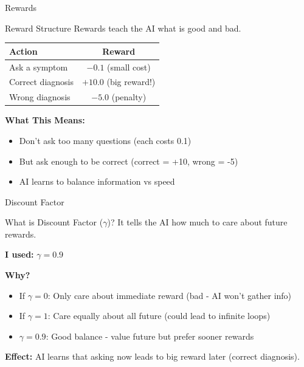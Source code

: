 \documentclass[aspectratio=169]{beamer}
\begin{document}
\begin{frame}{Rewards}
    \begin{block}{Reward Structure}
        Rewards teach the AI what is good and bad.
    \end{block}
    
    \vspace{0.3cm}
    
    \begin{table}
        \centering
        \begin{tabular}{lc}
            \toprule
            \textbf{Action} & \textbf{Reward} \\
            \midrule
            Ask a symptom & $-0.1$ (small cost) \\
            Correct diagnosis & $+10.0$ (big reward!) \\
            Wrong diagnosis & $-5.0$ (penalty) \\
            \bottomrule
        \end{tabular}
    \end{table}
    
    \vspace{0.3cm}
    
    \textbf{What This Means:}
    \begin{itemize}
        \item Don't ask too many questions (each costs 0.1)
        \item But ask enough to be correct (correct = +10, wrong = -5)
        \item AI learns to balance information vs speed
    \end{itemize}
\end{frame}

\begin{frame}{Discount Factor}
    \begin{block}{What is Discount Factor ($\gamma$)?}
        It tells the AI how much to care about future rewards.
    \end{block}
    
    \vspace{0.5cm}
    
    \textbf{I used:} $\gamma = 0.9$
    
    \vspace{0.3cm}
    
    \textbf{Why?}
    \begin{itemize}
        \item If $\gamma = 0$: Only care about immediate reward (bad - AI won't gather info)
        \item If $\gamma = 1$: Care equally about all future (could lead to infinite loops)
        \item $\gamma = 0.9$: Good balance - value future but prefer sooner rewards
    \end{itemize}
    
    \vspace{0.3cm}
    
    \textbf{Effect:} AI learns that asking now leads to big reward later (correct diagnosis).
\end{frame}
\end{document}

